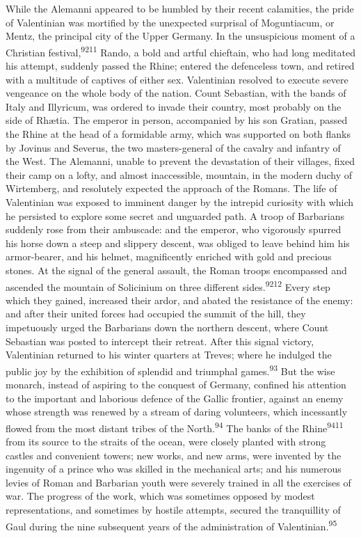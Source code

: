 While the Alemanni appeared to be humbled by their recent
calamities, the pride of Valentinian was mortified by the
unexpected surprisal of Moguntiacum, or Mentz, the principal city
of the Upper Germany. In the unsuspicious moment of a Christian
festival,\textsuperscript{9211} Rando, a bold and artful chieftain, who had long
meditated his attempt, suddenly passed the Rhine; entered the
defenceless town, and retired with a multitude of captives of
either sex. Valentinian resolved to execute severe vengeance on
the whole body of the nation. Count Sebastian, with the bands of
Italy and Illyricum, was ordered to invade their country, most
probably on the side of Rhætia. The emperor in person,
accompanied by his son Gratian, passed the Rhine at the head of a
formidable army, which was supported on both flanks by Jovinus
and Severus, the two masters-general of the cavalry and infantry
of the West. The Alemanni, unable to prevent the devastation of
their villages, fixed their camp on a lofty, and almost
inaccessible, mountain, in the modern duchy of Wirtemberg, and
resolutely expected the approach of the Romans. The life of
Valentinian was exposed to imminent danger by the intrepid
curiosity with which he persisted to explore some secret and
unguarded path. A troop of Barbarians suddenly rose from their
ambuscade: and the emperor, who vigorously spurred his horse down
a steep and slippery descent, was obliged to leave behind him his
armor-bearer, and his helmet, magnificently enriched with gold
and precious stones. At the signal of the general assault, the
Roman troops encompassed and ascended the mountain of Solicinium
on three different sides.\textsuperscript{9212} Every step which they gained,
increased their ardor, and abated the resistance of the enemy:
and after their united forces had occupied the summit of the
hill, they impetuously urged the Barbarians down the northern
descent, where Count Sebastian was posted to intercept their
retreat. After this signal victory, Valentinian returned to his
winter quarters at Treves; where he indulged the public joy by
the exhibition of splendid and triumphal games.\textsuperscript{93} But the wise
monarch, instead of aspiring to the conquest of Germany, confined
his attention to the important and laborious defence of the
Gallic frontier, against an enemy whose strength was renewed by a
stream of daring volunteers, which incessantly flowed from the
most distant tribes of the North.\textsuperscript{94} The banks of the Rhine\textsuperscript{9411}
from its source to the straits of the ocean, were closely planted
with strong castles and convenient towers; new works, and new
arms, were invented by the ingenuity of a prince who was skilled
in the mechanical arts; and his numerous levies of Roman and
Barbarian youth were severely trained in all the exercises of
war. The progress of the work, which was sometimes opposed by
modest representations, and sometimes by hostile attempts,
secured the tranquillity of Gaul during the nine subsequent years
of the administration of Valentinian.\textsuperscript{95}


